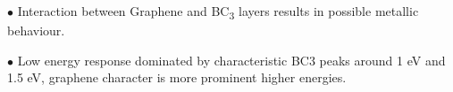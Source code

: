 \documentclass[a0paper,portrait]{baposter}
\begin{document}
\begin{poster}
{\vspace{0pt}\begin{minipage}{1\linewidth}\begin{center}\footnotesize
    \begin{tcolorbox}[colback=table_color_2, colframe=table_color_2, rounded corners, boxsep=2pt, left=0pt, right=0pt, top=0pt, bottom=0pt]
        \par $\bullet$ Interaction between Graphene and BC\textsubscript{3} layers results in possible metallic behaviour.
        \par $\bullet$ Low energy response dominated by characteristic BC3 peaks around 1 eV and 1.5 eV, graphene character is more prominent higher energies.
    \end{tcolorbox}
\end{center}\end{minipage}

}
\end{poster}
\end{document}
